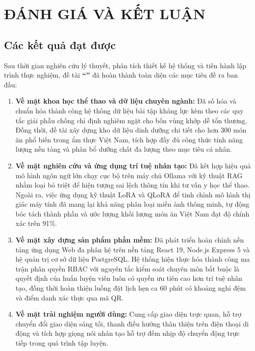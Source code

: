 
\chapter{ĐÁNH GIÁ VÀ KẾT LUẬN}
\label{chap:ketluan}

\section{Các kết quả đạt được}
\label{sec:ketqua_datduoc}

Sau thời gian nghiên cứu lý thuyết, phân tích thiết kế hệ thống và tiến hành lập trình thực nghiệm, đề tài \textbf{``\reporttitle''} đã hoàn thành toàn diện các mục tiêu đề ra ban đầu:
\begin{enumerate}[label=\arabic*)]
    \item \textbf{Về mặt khoa học thể thao và dữ liệu chuyên ngành:} Đã số hóa và chuẩn hóa thành công hệ thống dữ liệu bài tập kháng lực kèm theo các quy tắc giải phẫu chống chỉ định nghiêm ngặt cho bốn vùng khớp dễ tổn thương. Đồng thời, đề tài xây dựng kho dữ liệu dinh dưỡng chi tiết cho hơn 300 món ăn phổ biến trong ẩm thực Việt Nam, tích hợp đầy đủ công thức tính năng lượng nền tảng và phân bổ dưỡng chất đa lượng theo mục tiêu cá nhân.
    \item \textbf{Về mặt nghiên cứu và ứng dụng trí tuệ nhân tạo:} Đã kết hợp hiệu quả mô hình ngôn ngữ lớn chạy cục bộ trên máy chủ Ollama với kỹ thuật RAG nhằm loại bỏ triệt để hiện tượng sai lệch thông tin khi tư vấn y học thể thao. Ngoài ra, việc ứng dụng kỹ thuật LoRA và QLoRA để tinh chỉnh mô hình thị giác máy tính đã mang lại khả năng phân loại miền ảnh thông minh, tự động bóc tách thành phần và ước lượng khối lượng món ăn Việt Nam đạt độ chính xác trên 91\%.
    \item \textbf{Về mặt xây dựng sản phẩm phần mềm:} Đã phát triển hoàn chỉnh nền tảng ứng dụng Web đa phân hệ trên nền tảng React 19, Node.js Express 5 và hệ quản trị cơ sở dữ liệu PostgreSQL. Hệ thống hiện thực hóa thành công ma trận phân quyền RBAC với nguyên tắc kiểm soát chuyên môn bắt buộc là quyết định của huấn luyện viên luôn có quyền ưu tiên cao hơn trí tuệ nhân tạo, đồng thời hoàn thiện luồng đặt lịch hẹn ca 60 phút có khoảng nghỉ đệm và điểm danh xác thực qua mã QR.
    \item \textbf{Về mặt trải nghiệm người dùng:} Cung cấp giao diện trực quan, hỗ trợ chuyển đổi giao diện sáng tối, thanh điều hướng thân thiện trên điện thoại di động và tích hợp giọng nói nhân tạo hỗ trợ đếm nhịp độ chuyển động trực tiếp trong quá trình tập luyện.
\end{enumerate}

